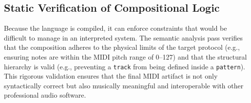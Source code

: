 \subsection{Static Verification of Compositional Logic}

Because the language is compiled, it can enforce constraints that would be difficult to manage in an interpreted system.
The semantic analysis pass verifies that the composition adheres to the physical limits of the target
protocol (e.g., ensuring notes are within the MIDI pitch range of 0--127) and that the structural hierarchy
is valid (e.g., preventing a \texttt{track} from being defined inside a \texttt{pattern}).
This rigorous validation ensures that the final MIDI artifact is not only syntactically correct but also
musically meaningful and interoperable with other professional audio software.
